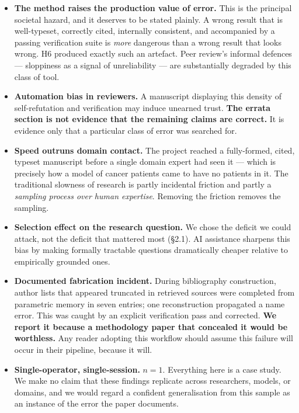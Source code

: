 \documentclass[11pt,a4paper]{article}
\begin{document}
\begin{itemize}[leftmargin=1.4em,itemsep=0.35em]

\item \textbf{The method raises the production value of error.} This is the principal
societal hazard, and it deserves to be stated plainly. A wrong result that is
well-typeset, correctly cited, internally consistent, and accompanied by a passing
verification suite is \emph{more} dangerous than a wrong result that looks wrong. H6
produced exactly such an artefact. Peer review's informal defences --- sloppiness as a
signal of unreliability --- are substantially degraded by this class of tool.

\item \textbf{Automation bias in reviewers.} A manuscript displaying this density of
self-refutation and verification may induce unearned trust. \textbf{The errata section is
not evidence that the remaining claims are correct.} It is evidence only that a
particular class of error was searched for.

\item \textbf{Speed outruns domain contact.} The project reached a fully-formed,
cited, typeset manuscript before a single domain expert had seen it --- which is
precisely how a model of cancer patients came to have no patients in it. The traditional
slowness of research is partly incidental friction and partly a \emph{sampling process
over human expertise}. Removing the friction removes the sampling.

\item \textbf{Selection effect on the research question.} We chose the deficit we could
attack, not the deficit that mattered most (\S2.1). AI assistance sharpens this bias by
making formally tractable questions dramatically cheaper relative to empirically
grounded ones.

\item \textbf{Documented fabrication incident.} During bibliography construction, author
lists that appeared truncated in retrieved sources were completed from parametric memory
in seven entries; one reconstruction propagated a name error. This was caught by an
explicit verification pass and corrected. \textbf{We report it because a methodology
paper that concealed it would be worthless.} Any reader adopting this workflow should
assume this failure will occur in their pipeline, because it will.

\item \textbf{Single-operator, single-session.} $n = 1$. Everything here is a case study.
We make no claim that these findings replicate across researchers, models, or domains,
and we would regard a confident generalisation from this sample as an instance of the
error the paper documents.
\end{itemize}
\end{document}
